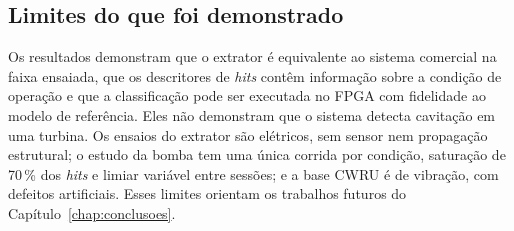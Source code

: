 \subsection{Limites do que foi demonstrado}

Os resultados demonstram que o extrator é equivalente ao sistema comercial na faixa ensaiada, que os descritores de \textit{hits} contêm informação sobre a condição de operação e que a classificação pode ser executada no FPGA com fidelidade ao modelo de referência. Eles não demonstram que o sistema detecta cavitação em uma turbina. Os ensaios do extrator são elétricos, sem sensor nem propagação estrutural; o estudo da bomba tem uma única corrida por condição, saturação de 70\,\% dos \textit{hits} e limiar variável entre sessões; e a base CWRU é de vibração, com defeitos artificiais. Esses limites orientam os trabalhos futuros do Capítulo~\ref{chap:conclusoes}.
